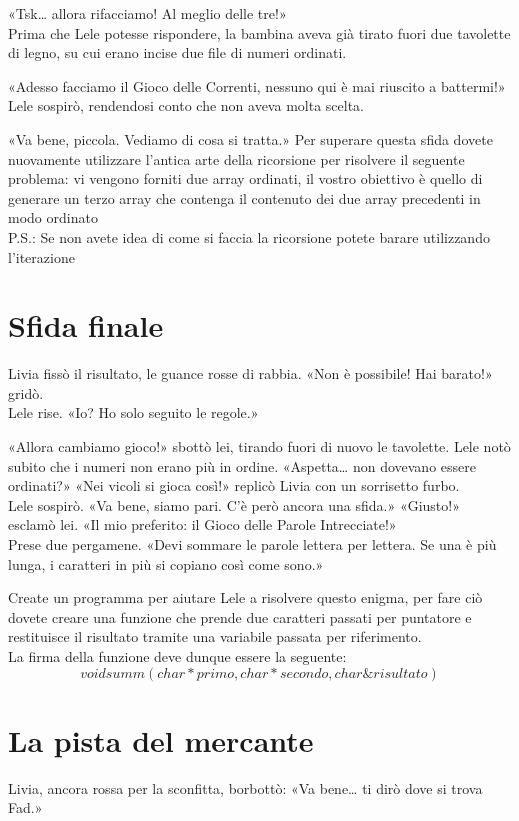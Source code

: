 \documentclass[a4paper]{article}
\begin{document}
«Tsk… allora rifacciamo! Al meglio delle tre!»\\
Prima che Lele potesse rispondere, la bambina aveva già tirato fuori due tavolette di legno, su cui erano incise due file di numeri ordinati.

«Adesso facciamo il Gioco delle Correnti, nessuno qui è mai riuscito a battermi!»\\
Lele sospirò, rendendosi conto che non aveva molta scelta.

«Va bene, piccola. Vediamo di cosa si tratta.»
Per superare questa sfida dovete nuovamente utilizzare l'antica arte della ricorsione per risolvere il seguente problema: vi vengono forniti due array ordinati, il vostro obiettivo è quello di generare un terzo array che contenga il contenuto dei due array precedenti in modo ordinato\\
P.S.: Se non avete idea di come si faccia la ricorsione potete barare utilizzando l'iterazione

\section*{Sfida finale}
Livia fissò il risultato, le guance rosse di rabbia.
«Non è possibile! Hai barato!» gridò.\\
Lele rise. «Io? Ho solo seguito le regole.»

«Allora cambiamo gioco!» sbottò lei, tirando fuori di nuovo le tavolette.
Lele notò subito che i numeri non erano più in ordine.
«Aspetta… non dovevano essere ordinati?»
«Nei vicoli si gioca così!» replicò Livia con un sorrisetto furbo.\\
Lele sospirò. «Va bene, siamo pari. C'è però ancora una sfida.»
«Giusto!» esclamò lei. «Il mio preferito: il Gioco delle Parole Intrecciate!»\\
Prese due pergamene. «Devi sommare le parole lettera per lettera.
Se una è più lunga, i caratteri in più si copiano così come sono.»

Create un programma per aiutare Lele a risolvere questo enigma, per fare ciò dovete creare una funzione che prende due caratteri passati per puntatore e restituisce il risultato tramite una variabile passata per riferimento.\\
La firma della funzione deve dunque essere la seguente: \begin{equation*}void summ(char* primo, char* secondo, char\& risultato)\end{equation*}

\section*{La pista del mercante}
Livia, ancora rossa per la sconfitta, borbottò:
«Va bene… ti dirò dove si trova Fad.»
\end{document}
